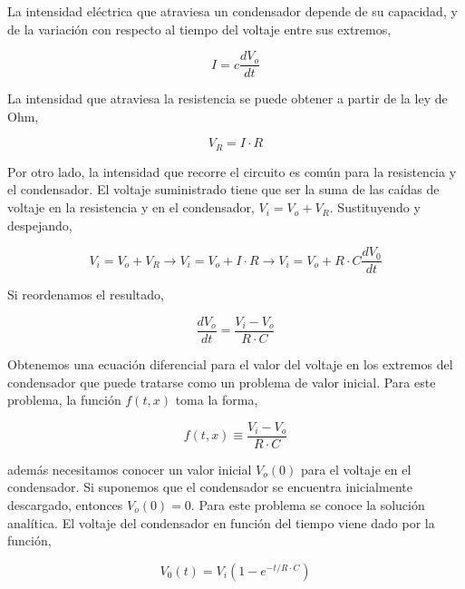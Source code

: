 La intensidad eléctrica que atraviesa un condensador depende de su capacidad, y de la variación con respecto al tiempo del voltaje entre sus extremos,

\begin{equation*}
I=c\frac{dV_o}{dt}
\end{equation*}

La intensidad que atraviesa la resistencia se puede obtener a partir de la ley de Ohm,

\begin{equation*}
V_R=I\cdot R
\end{equation*}

Por otro lado, la intensidad que recorre el circuito es común para la resistencia y el condensador. El voltaje suministrado tiene que ser la suma de las caídas de voltaje en la resistencia y en el condensador, $V_i=V_o+V_R$. Sustituyendo y despejando,

\begin{equation*}
V_i=V_o+V_R \rightarrow V_i=V_o+I\cdot R \rightarrow V_i=V_o+R\cdot C\frac{dV_0}{dt}
\end{equation*}

Si reordenamos el resultado, 

\begin{equation*}
\frac{dV_o}{dt}=\frac{V_i-V_o}{R \cdot C}
\end{equation*}

Obtenemos una ecuación diferencial para el valor del voltaje en los extremos del condensador que puede tratarse como un  problema de valor inicial. Para este problema, la función $f(t,x)$ toma la forma,

\begin{equation*}
f(t,x) \equiv \frac{V_i-V_o}{R \cdot C}
\end{equation*}

además necesitamos conocer un valor inicial $V_o(0)$ para el voltaje en el condensador. Si suponemos que el condensador se encuentra inicialmente descargado, entonces $V_o(0)=0$. Para este problema se conoce la solución analítica. El voltaje del condensador en función del tiempo viene dado por la función,

\begin{equation*}
V_0(t)=V_i\left(1-e^{-t/R\cdot C}\right)
\end{equation*} 


